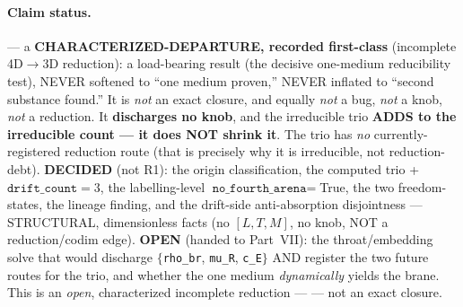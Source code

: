 \paragraph{Claim status.}
\StatusOpen{} --- a \textbf{CHARACTERIZED-DEPARTURE, recorded first-class}
(incomplete 4D\(\to\)3D reduction): a load-bearing result (the decisive
one-medium reducibility test), NEVER softened to ``one medium proven,'' NEVER
inflated to ``second substance found.'' It is \emph{not} an exact closure, and
equally \emph{not} a bug, \emph{not} a knob, \emph{not} a reduction. It
\textbf{discharges no knob}, and the irreducible trio \textbf{ADDS to the
irreducible count --- it does NOT shrink it}. The trio has \emph{no}
currently-registered reduction route (that is precisely why it is irreducible,
not reduction-debt). \textbf{DECIDED} (not R1): the origin classification, the
computed trio + \(\texttt{drift\_count}=3\), the labelling-level
\(\texttt{no\_fourth\_arena}=\)True, the two freedom-states, the lineage
finding, and the drift-side anti-absorption disjointness --- STRUCTURAL,
dimensionless facts (no \([L,T,M]\), no knob, NOT a reduction/codim edge).
\textbf{OPEN} (handed to Part~VII): the throat/embedding solve that would
discharge \(\{\)\texttt{rho\_br}, \texttt{mu\_R}, \texttt{c\_E}\(\}\) AND
register the two future routes for the trio, and whether the one medium
\emph{dynamically} yields the brane. This is an \emph{open}, characterized
incomplete reduction --- \StatusOpen{} --- not an exact closure.

